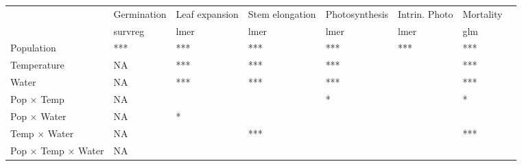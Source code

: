 \documentclass[11pt, oneside]{article}\usepackage[]{graphicx}\usepackage[]{color}
\begin{document}
\begin{table}[ht]
   \centering
   \begin{tabular}{@{} llllllll @{}}
      \toprule
                                   & Germination & Leaf expansion & Stem elongation & Photosynthesis & Intrin. Photo & Mortality \\
                                   & survreg     & lmer           & lmer            & lmer           & lmer          & glm \\
      \midrule
  Population                       &
    ***  &
    *** &
    *** &
    *** & 
    *** & 
    *** & \\
  Temperature                      &
    NA                                                          &
    ***    &
    *** &
    *** & 
     &
    *** & \\
  Water                            &
    NA                                                          &
    ***   &
    ***   &
    *** & 
     &     
    *** & \\
  Pop $\times$ Temp                &
    NA                                                          &
     &
     &
    * & 
     &     
    * & \\
  Pop $\times$ Water               &
     NA                                                          &
    * &
     &
     & 
     &     
     & \\
  Temp $\times$ Water              &
    NA                                                          &
     &
    *** &
     & 
     &     
    *** & \\
  Pop $\times$ Temp $\times$ Water &
    NA                                                          &
     &
     &
     & 
     &     
     & \\
      \bottomrule
   \end{tabular}
   \label{table:Table_AnovaSummary}
\end{table}

\end{document}
